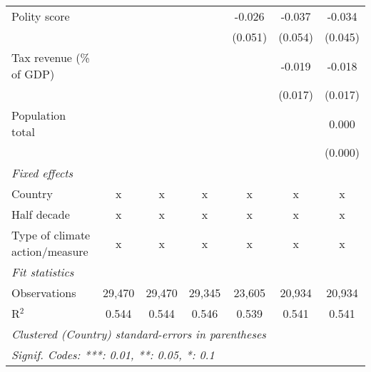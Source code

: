 \begin{tabular}{lcccccc}
   Polity score                                                             &         &              &               & -0.026       & -0.037       & -0.034\\   
                                                                            &         &              &               & (0.051)      & (0.054)      & (0.045)\\   
   Tax revenue (\% of GDP)                                                  &         &              &               &              & -0.019       & -0.018\\   
                                                                            &         &              &               &              & (0.017)      & (0.017)\\   
   Population total                                                         &         &              &               &              &              & 0.000\\   
                                                                            &         &              &               &              &              & (0.000)\\   
   \emph{Fixed effects}\\
   Country                                                                  & x       & x            & x             & x            & x            & x\\  
   Half decade                                                              & x       & x            & x             & x            & x            & x\\  
   Type of climate action/measure                                           & x       & x            & x             & x            & x            & x\\  
   \midrule \emph{Fit statistics}\\
   Observations                                                             & 29,470  & 29,470       & 29,345        & 23,605       & 20,934       & 20,934\\  
   R$^2$                                                                    & 0.544   & 0.544        & 0.546         & 0.539        & 0.541        & 0.541\\  
   \midrule
   \multicolumn{7}{l}{\emph{Clustered (Country) standard-errors in parentheses}}\\
   \multicolumn{7}{l}{\emph{Signif. Codes: ***: 0.01, **: 0.05, *: 0.1}}\\
\end{tabular}
\par\endgroup


